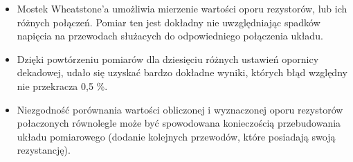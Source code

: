 \documentclass [a4paper,11pt]{article}
\begin{document}
\begin{itemize}
	\item Mostek Wheatstone'a umożliwia mierzenie wartości oporu rezystorów, lub ich różnych połączeń. Pomiar ten jest dokładny nie uwzględniając spadków napięcia na przewodach służacych do odpowiedniego połączenia układu.
	\item Dzięki powtórzeniu pomiarów dla dziesięciu różnych ustawień opornicy dekadowej, udało się uzyskać bardzo dokładne wyniki, których błąd względny nie przekracza 0,5 \%. 
	\item Niezgodność porównania wartości obliczonej i wyznaczonej oporu rezystorów połaczonych równolegle może być spowodowana konieczością przebudowania układu pomiarowego (dodanie kolejnych przewodów, które posiadają swoją rezystancję).
\end{itemize}
\end{document}
